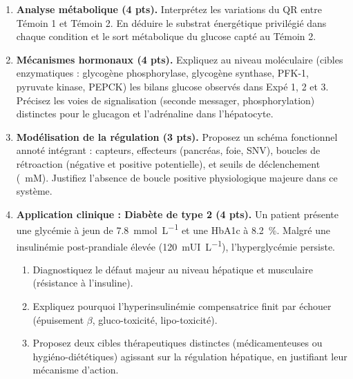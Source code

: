 \documentclass[11pt]{article}
\begin{document}
\begin{exercice}
\begin{enumerate}
    \item \textbf{Analyse métabolique (4 pts).} Interprétez les variations du QR entre Témoin 1 et Témoin 2. En déduire le substrat énergétique privilégié dans chaque condition et le sort métabolique du glucose capté au Témoin 2.
    \item \textbf{Mécanismes hormonaux (4 pts).} Expliquez au niveau moléculaire (cibles enzymatiques : glycogène phosphorylase, glycogène synthase, PFK-1, pyruvate kinase, PEPCK) les bilans glucose observés dans Expé 1, 2 et 3. Précisez les voies de signalisation (seconde messager, phosphorylation) distinctes pour le glucagon et l'adrénaline dans l'hépatocyte.
    \item \textbf{Modélisation de la régulation (3 pts).} Proposez un schéma fonctionnel annoté intégrant : capteurs, effecteurs (pancréas, foie, SNV), boucles de rétroaction (négative et positive potentielle), et seuils de déclenchement (\SI{}{mM}). Justifiez l'absence de boucle positive physiologique majeure dans ce système.
    \item \textbf{Application clinique : Diabète de type 2 (4 pts).} Un patient présente une glycémie à jeun de \SI{7,8}{mmol.L^{-1}} et une HbA1c à \SI{8,2}{\%}. Malgré une insulinémie post-prandiale élevée (\SI{120}{mUI.L^{-1}}), l'hyperglycémie persiste. 
    \begin{enumerate}
        \item Diagnostiquez le défaut majeur au niveau hépatique et musculaire (résistance à l'insuline). 
        \item Expliquez pourquoi l'hyperinsulinémie compensatrice finit par échouer (épuisement $\beta$, gluco-toxicité, lipo-toxicité). 
        \item Proposez deux cibles thérapeutiques distinctes (médicamenteuses ou hygiéno-diététiques) agissant sur la régulation hépatique, en justifiant leur mécanisme d'action.
    \end{enumerate}
\end{enumerate}
\end{exercice}
\end{document}
